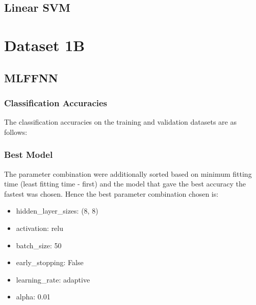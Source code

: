 \documentclass[11pt,a4paper]{article}
\begin{document}
\subsection{Linear SVM}

\break
\section{Dataset 1B}
\subsection{MLFFNN}
\subsubsection{Classification Accuracies}
The classification accuracies on the training and validation datasets are as follows:


\subsubsection{Best Model}
The parameter combination were additionally sorted based on minimum fitting time (least fitting time - first) and the model that gave the best accuracy the fastest was chosen. Hence the best parameter combination chosen is:
\begin{itemize}
    \itemsep0em
    \item hidden\_layer\_sizes: (8, 8)
    \item activation: relu
    \item batch\_size: 50
    \item early\_stopping: False
    \item learning\_rate: adaptive
    \item alpha: 0.01
\end{itemize}
\end{document}
